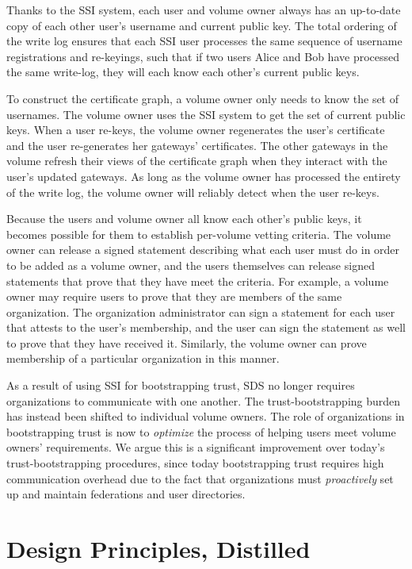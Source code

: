 Thanks to the SSI system, each user and volume owner always has an up-to-date
copy of each other user's username and current public key.  The total ordering
of the write log ensures that each SSI user processes the same sequence of
username registrations and re-keyings, such that if two users Alice and Bob have
processed the same write-log, they will each know each other's current public
keys.

To construct the certificate graph, a volume owner only needs to know the set of
usernames.  The volume owner uses the SSI system to get the set of current
public keys.  When a user re-keys, the volume owner regenerates the user's
certificate and the user re-generates her gateways' certificates.  The other
gateways in the volume refresh their views of the certificate graph when they
interact with the user's updated gateways.  As long as the volume owner has
processed the entirety of the write log, the volume owner will reliably detect
when the user re-keys.

Because the users and volume owner all know each other's public keys, it becomes
possible for them to establish per-volume vetting criteria.  The volume owner
can release a signed statement describing what each user must do in order to be
added as a volume owner, and the users themselves can release signed statements
that prove that they have meet the criteria.  For example, a volume owner may
require users to prove that they are members of the same organization.  The
organization administrator can sign a statement for each user that attests to the user's
membership, and the user can sign the statement as well to prove that they have
received it.  Similarly, the volume owner can prove membership of a particular
organization in this manner.

As a result of using SSI for bootstrapping trust, SDS no longer requires
organizations to communicate with one another.
The trust-bootstrapping burden has instead been shifted to individual volume owners.
The role of organizations in bootstrapping trust is now to \emph{optimize} the
process of helping users meet volume owners' requirements.  We argue this is a
significant improvement over today's trust-bootstrapping procedures, since today
bootstrapping trust requires high communication overhead due to the fact that
organizations must \emph{proactively} set up and maintain federations and user
directories.

\section{Design Principles, Distilled}


